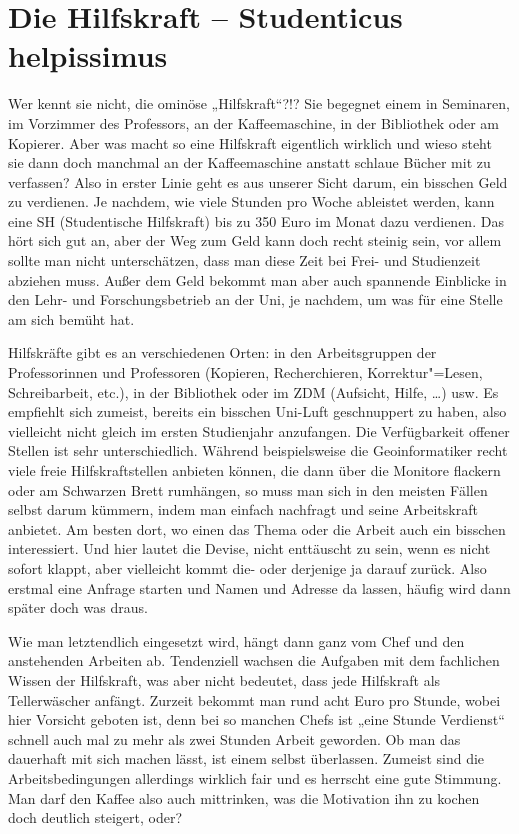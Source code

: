 \section{Die Hilfskraft – Studenticus helpissimus}
Wer kennt sie nicht, die ominöse „Hilfskraft“?!? Sie begegnet einem in Seminaren, im Vorzimmer des Professors, an der Kaffeemaschine, in der Bibliothek oder am Kopierer. Aber was macht so eine Hilfskraft eigentlich wirklich und wieso steht sie dann doch manchmal an der Kaffeemaschine anstatt schlaue Bücher mit zu verfassen? Also in erster Linie geht es aus unserer Sicht darum, ein bisschen Geld zu verdienen. Je nachdem, wie viele Stunden pro Woche ableistet werden, kann eine SH (Studentische Hilfskraft) bis zu 350 Euro im Monat dazu verdienen. Das hört sich gut an, aber der Weg zum Geld kann doch recht steinig sein, vor allem sollte man nicht unterschätzen, dass man diese Zeit bei Frei- und Studienzeit abziehen muss. Außer dem Geld bekommt man aber auch spannende Einblicke in den Lehr- und Forschungsbetrieb an der Uni, je nachdem, um was für eine Stelle am sich bemüht hat.\par
Hilfskräfte gibt es an verschiedenen Orten: in den Arbeitsgruppen der Professorinnen und Professoren (Kopieren, Recherchieren, Korrektur"=Lesen, Schreibarbeit, etc.), in der Bibliothek oder im ZDM (Aufsicht, Hilfe, …) usw. Es empfiehlt sich zumeist, bereits ein bisschen Uni-Luft geschnuppert zu haben, also vielleicht nicht gleich im ersten Studienjahr anzufangen. Die Verfügbarkeit offener Stellen ist sehr unterschiedlich. Während beispielsweise die Geoinformatiker recht viele freie Hilfskraftstellen anbieten können, die dann über die Monitore flackern oder am Schwarzen Brett rumhängen, so muss man sich in den meisten Fällen selbst darum kümmern, indem man einfach nachfragt und seine Arbeitskraft anbietet. Am besten dort, wo einen das Thema oder die Arbeit auch ein bisschen interessiert. Und hier lautet die Devise, nicht enttäuscht zu sein, wenn es nicht sofort klappt, aber vielleicht kommt die- oder derjenige ja darauf zurück. Also erstmal eine Anfrage starten und Namen und Adresse da lassen, häufig wird dann später doch was draus. 
\par
Wie man letztendlich eingesetzt wird, hängt dann ganz vom Chef und den anstehenden Arbeiten ab. Tendenziell wachsen die Aufgaben mit dem fachlichen Wissen der Hilfskraft, was aber nicht bedeutet, dass jede Hilfskraft als Tellerwäscher anfängt. Zurzeit bekommt man rund acht Euro pro Stunde, wobei hier Vorsicht geboten ist, denn bei so manchen Chefs ist „eine Stunde Verdienst“ schnell auch mal zu mehr als zwei Stunden Arbeit geworden. Ob man das dauerhaft mit sich machen lässt, ist einem selbst überlassen. Zumeist sind die Arbeitsbedingungen allerdings wirklich fair und es herrscht eine gute Stimmung. Man darf den Kaffee also auch mittrinken, was die Motivation ihn zu kochen doch deutlich steigert, oder? \par

